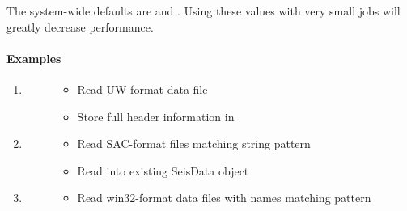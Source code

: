\documentclass[letterpaper,11pt,english]{sphinxmanual}
\begin{document}
The system-wide defaults are  and . Using these
values with very small jobs will greatly decrease performance.


\paragraph{Examples}
\label{\detokenize{src/Formats/timeseries:examples}}\begin{enumerate}
\def\theenumi{\arabic{enumi}}
\def\labelenumi{\theenumi .}
\makeatletter\def\p@enumii{\p@enumi \theenumi .}\makeatother
\item {} \begin{description}
\item[{}] \leavevmode\begin{itemize}
\item {} 
Read UW-format data file 

\item {} 
Store full header information in 

\end{itemize}

\end{description}

\item {} \begin{description}
\item[{}] \leavevmode\begin{itemize}
\item {} 
Read SAC-format files matching string pattern 

\item {} 
Read into existing SeisData object 

\end{itemize}

\end{description}

\item {} \begin{description}
\item[{}] \leavevmode\begin{itemize}
\item {} 
Read win32-format data files with names matching pattern 


\end{itemize}
\end{description}
\end{enumerate}
\end{document}
